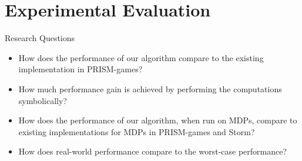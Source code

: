 \section{Experimental Evaluation}

\begin{frame}{Research Questions}
    \begin{itemize}[<+->]
    \item[\textbf{RQ1}:] How does the performance of our algorithm compare to the existing implementation in PRISM-games?
    \item[\textbf{RQ2}:] How much performance gain is achieved by performing the computations symbolically?
    \item[\textbf{RQ3}:] How does the performance of our algorithm, when run on MDPs, compare to existing implementations for MDPs in PRISM-games and Storm?
    \item[\textbf{RQ4}:] How does real-world performance compare to the worst-case performance?
\end{itemize}
\end{frame}

